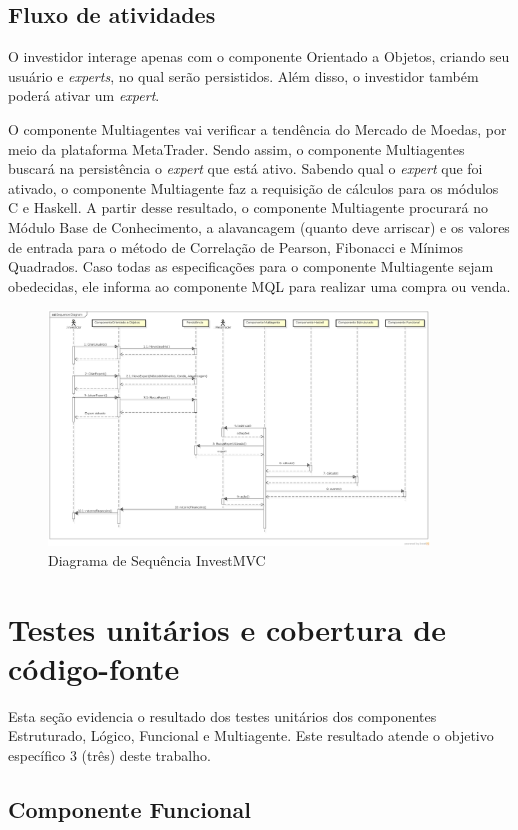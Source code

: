 \subsection{Fluxo de atividades}
O investidor interage apenas com o componente Orientado a Objetos, criando seu usuário e \textit{experts}, no qual serão persistidos. Além disso, o investidor também poderá ativar um \textit{expert}.

O componente Multiagentes vai verificar a tendência do Mercado de Moedas, por meio da plataforma MetaTrader. Sendo assim, o componente Multiagentes buscará na persistência o \textit{expert} que está ativo. Sabendo qual o \textit{expert} que foi ativado, o componente Multiagente faz a requisição de cálculos para os módulos C e Haskell. A partir desse resultado, o componente Multiagente procurará no Módulo Base de Conhecimento, a alavancagem (quanto deve arriscar) e os valores de entrada para o método de Correlação de Pearson, Fibonacci e Mínimos Quadrados. Caso todas as especificações para o componente Multiagente sejam obedecidas, ele informa ao componente MQL para realizar uma compra ou venda.

\begin{figure}[H]
\centering
\includegraphics[width=0.9\textwidth]{figuras/sequencia}
\caption{Diagrama de Sequência InvestMVC} 
\label{sequencia}
\end{figure}

\section{Testes unitários e cobertura de código-fonte}
Esta seção evidencia o resultado dos testes unitários dos componentes Estruturado, Lógico, Funcional e Multiagente. Este resultado atende o objetivo específico 3 (três) deste trabalho.
\subsection{Componente Funcional}

